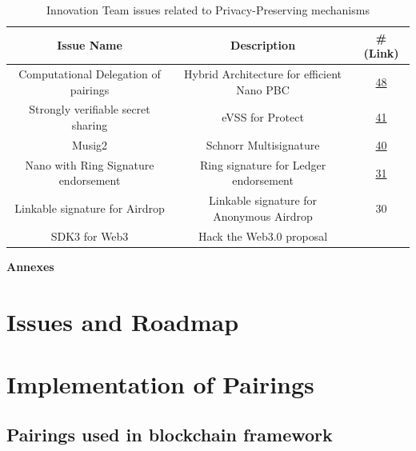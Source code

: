 \documentclass[11pt]{llncs2e/llncs}
\begin{document}
  
\begin{table}
 \begin{center} 
  \begin{tabular}{|c|c|c|}
   \hline
   Issue Name & Description & \# (Link) \\
   \hline
   Computational Delegation of pairings & Hybrid Architecture for efficient Nano PBC& \href{https://github.com/LedgerHQ/innovation/issues/48}{48}\\
   \hline
   Strongly verifiable secret sharing& eVSS for Protect & \href{https://github.com/LedgerHQ/innovation/issues/41}{41}\\
   \hline
   Musig2 &  Schnorr Multisignature& \href{https://github.com/LedgerHQ/innovation/issues/40}{40}\\
   \hline
   Nano with Ring Signature endorsement &  Ring signature for Ledger endorsement& \href{https://github.com/LedgerHQ/innovation/issues/31}{31}\\
   \hline
   Linkable signature for Airdrop & Linkable signature for Anonymous Airdrop& 30 \\
   \hline
   SDK3 for Web3 &Hack the Web3.0 proposal & \\
   \hline
  \end{tabular}

 \end{center} 
\caption{Innovation Team issues related to Privacy-Preserving mechanisms}
\end{table}





\appendix
\newpage
{\noindent\huge{\bf Annexes}}

\section{Issues and Roadmap}



\section{Implementation of Pairings}



\subsection{Pairings used in blockchain framework}
\end{document}
